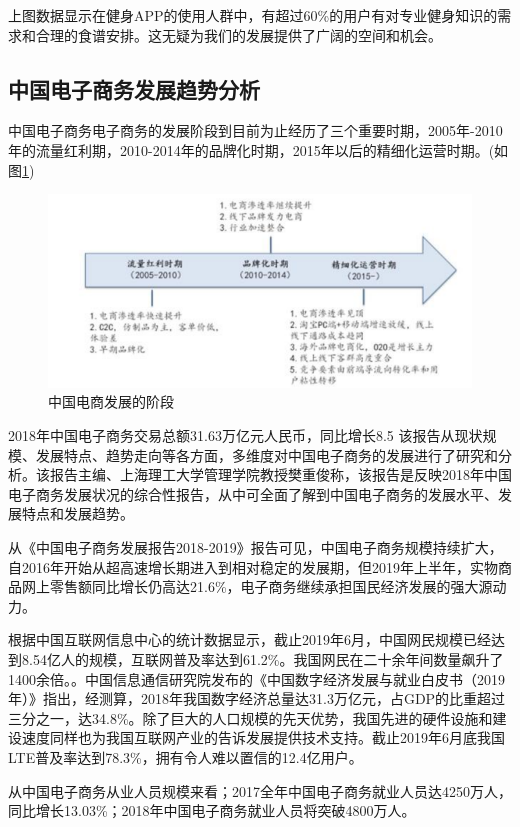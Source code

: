 \documentclass[UTF8,12pt]{ctexart}
\numberwithin{figure}{section}%
\begin{document}
\begin{spacing}{2}
上图数据显示在健身APP的使用人群中，有超过60\%的用户有对专业健身知识的需求和合理的食谱安排。这无疑为我们的发展提供了广阔的空间和机会。


\subsection{中国电子商务发展趋势分析}
中国电子商务电子商务的发展阶段到目前为止经历了三个重要时期，2005年-2010年的流量红利期，2010-2014年的品牌化时期，2015年以后的精细化运营时期。(如图\ref{8})

\begin{figure}[!htb]
	\centering
	\includegraphics[width=12cm]{fig/8}
	\caption{中国电商发展的阶段}\label{8}
\end{figure}

2018年中国电子商务交易总额31.63万亿元人民币，同比增长8.5%
该报告从现状规模、发展特点、趋势走向等各方面，多维度对中国电子商务的发展进行了研究和分析。该报告主编、上海理工大学管理学院教授樊重俊称，该报告是反映2018年中国电子商务发展状况的综合性报告，从中可全面了解到中国电子商务的发展水平、发展特点和发展趋势。

从《中国电子商务发展报告2018-2019》报告可见，中国电子商务规模持续扩大，自2016年开始从超高速增长期进入到相对稳定的发展期，但2019年上半年，实物商品网上零售额同比增长仍高达21.6\%，电子商务继续承担国民经济发展的强大源动力。


根据中国互联网信息中心的统计数据显示，截止2019年6月，中国网民规模已经达到8.54亿人的规模，互联网普及率达到61.2\%。我国网民在二十余年间数量飙升了1400余倍。。中国信息通信研究院发布的《中国数字经济发展与就业白皮书（2019年）》指出，经测算，2018年我国数字经济总量达31.3万亿元，占GDP的比重超过三分之一，达34.8\%。除了巨大的人口规模的先天优势，我国先进的硬件设施和建设速度同样也为我国互联网产业的告诉发展提供技术支持。截止2019年6月底我国LTE普及率达到78.3\%，拥有令人难以置信的12.4亿用户。

从中国电子商务从业人员规模来看；2017全年中国电子商务就业人员达4250万人，同比增长13.03\%；2018年中国电子商务就业人员将突破4800万人。



\end{spacing}
\end{document}
